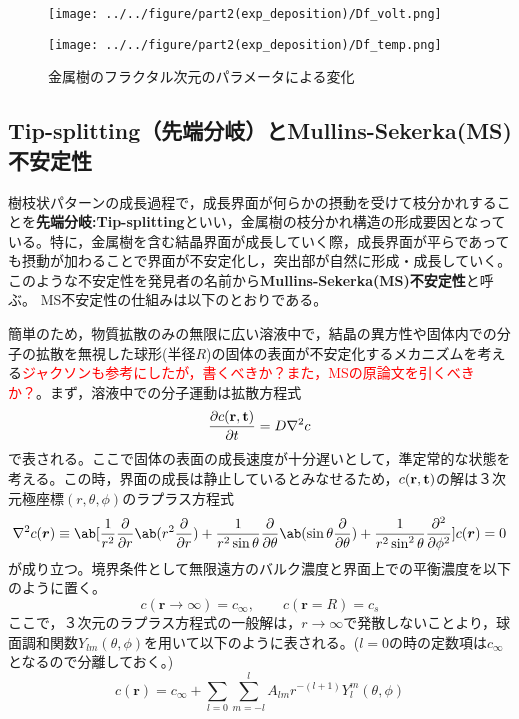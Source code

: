 \documentclass[autodetect-engine,dvi=dvipdfmx,a4paper,ja=standard,oneside,openany,11pt,draft]{bxjsbook}
\begin{document}
\begin{figure}[H]
  \begin{minipage}
    {0.5\textwidth}
    \centering
    \texttt{[image: ../../figure/part2(exp\_deposition)/Df\_volt.png]}
    \label{fig:Df_volt}
  \end{minipage}
  \begin{minipage}
    {0.5\textwidth}
    \centering
    \texttt{[image: ../../figure/part2(exp\_deposition)/Df\_temp.png]}
    \label{fig:Df_temp}
  \end{minipage}
  \caption{金属樹のフラクタル次元のパラメータによる変化}
\end{figure}

\subsection{Tip-splitting（先端分岐）とMullins-Sekerka(MS)不安定性}
樹枝状パターンの成長過程で，成長界面が何らかの摂動を受けて枝分かれすることを\textbf{先端分岐:Tip-splitting}といい，金属樹の枝分かれ構造の形成要因となっている。特に，金属樹を含む結晶界面が成長していく際，成長界面が平らであっても摂動が加わることで界面が不安定化し，突出部が自然に形成・成長していく。このような不安定性を発見者の名前から\textbf{Mullins-Sekerka(MS)不安定性}と呼ぶ\cite{}。
MS不安定性の仕組みは以下のとおりである。

簡単のため，物質拡散のみの無限に広い溶液中で，結晶の異方性や固体内での分子の拡散を無視した球形(半径$R$)の固体の表面が不安定化するメカニズムを考える\cite{フラクタル科学}\textcolor{red}{ジャクソンも参考にしたが，書くべきか？また，MSの原論文を引くべきか？}。まず，溶液中での分子運動は拡散方程式
\begin{equation}
  \frac{\partial c(\bf{r},t)}{\partial t} = D\nabla^2c
  \label{eq:diffusion}
\end{equation}
で表される。ここで固体の表面の成長速度が十分遅いとして，準定常的な状態を考える。この時，界面の成長は静止しているとみなせるため，$c(\bf{r},t)$の解は３次元極座標$(r,\theta,\phi)$のラプラス方程式
\begin{equation}
  \nabla^2c(\bm{r})\equiv \ab[\frac{1}{r^2}\pdv*{\ab(r^2\pdv{}{r})}{r}+\frac{1}{r^2\sin\theta}\pdv*{\ab(\sin\theta\pdv{}{\theta})}{\theta}+\frac{1}{r^2\sin^2\theta}\pdv[2]{}{\phi}]c(\bm{r})=0
  \label{eq:laplace}
\end{equation}
が成り立つ。境界条件として無限遠方のバルク濃度と界面上での平衡濃度を以下のように置く。
\begin{equation}
  c(\bm{r}\rightarrow \infty)  = c_{\infty}, \qquad c(\bm{r}=R)= c_s
  \label{eq:boundary}
\end{equation}
ここで，３次元のラプラス方程式の一般解は，$r\to\infty$で発散しないことより，球面調和関数$Y_{lm}(\theta,\phi)$を用いて以下のように表される。($l=0$の時の定数項は$c_\infty$となるので分離しておく。)
\begin{equation}
  c(\bm{r}) = c_{\infty} + \sum_{l=0}\sum_{m=-l}^{l}A_{lm}r^{-(l+1)}Y_{l}^{m}(\theta,\phi)
  \label{eq:spherical}
\end{equation}
\end{document}
